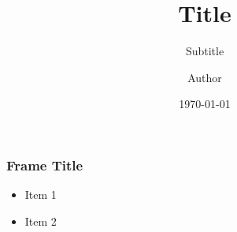 \documentclass[xcolor=dvipsnames,aspectratio=1610,handout]{beamer}
\title{Title}
\subtitle{\small Subtitle}
\author[xxx]{Author} %
\institute{\small Institute}
\date{\tiny\today}
\begin{document}
\begin{frame}
    \titlepage
\end{frame}
\begin{frame}
    \frametitle{Frame Title}
    \begin{itemize}
        \item Item 1
        \item Item 2
    \end{itemize}
\end{frame}
\end{document}
